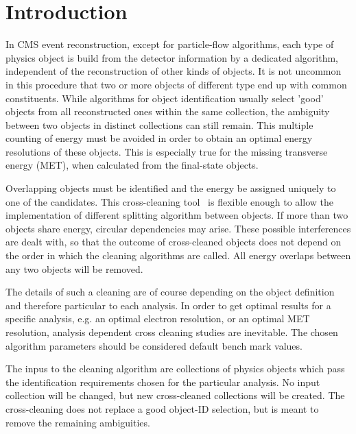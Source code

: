 \documentclass{cmspaper}
\begin{document}
\setcounter{page}{2}%


\newpage
\section{Introduction}

In CMS event reconstruction, except for particle-flow algorithms, each type of
physics object is build from the detector information by a dedicated algorithm,
independent of the reconstruction of other kinds of objects. It is not
uncommon in this procedure that two or more objects of different type end up
with common constituents.  While algorithms for object identification usually
select 'good' objects from all reconstructed ones within the same collection,
the ambiguity between two objects in distinct collections can still remain.
This multiple counting of energy must be avoided in order to obtain an optimal
energy resolutions of these objects. This is especially true for the missing
transverse energy (MET), when calculated from the final-state objects.

Overlapping objects must be identified and the energy be assigned uniquely to
one of the candidates. This cross-cleaning tool~\cite{package} is flexible enough to allow the
implementation of different splitting algorithm between objects. If more than
two objects share energy, circular dependencies may arise. These possible
interferences are dealt with, so that the outcome of cross-cleaned objects does
not depend on the order in which the cleaning algorithms are called.
All energy overlaps between any two objects will be removed.

The details of such a cleaning are of course depending on the object definition
and therefore particular to each analysis. In order to get optimal results for
a specific analysis, e.g. an optimal electron resolution, or an optimal MET
resolution, analysis dependent cross cleaning studies are inevitable. The
chosen algorithm parameters should be considered default bench mark values.

The inpus to the cleaning algorithm are collections of physics objects which pass the
identification requirements chosen for the particular analysis. No input
collection will be changed, but new cross-cleaned collections will be created.
The cross-cleaning does not replace a good object-ID selection, but is meant to
remove the remaining ambiguities.
\end{document}
